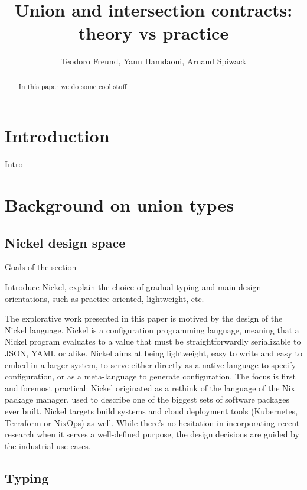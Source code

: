 \documentclass{article}
\title{Union and intersection contracts: theory vs practice}
\author{Teodoro Freund, Yann Hamdaoui, Arnaud Spiwack}
\begin{document}
\maketitle

\begin{abstract}
 In this paper we do some cool stuff.
\end{abstract}

\section*{Introduction}
Intro

\section{Background on union types}

\subsection{Nickel design space}

\color{red}Goals of the section

Introduce Nickel, explain the choice of gradual
typing and main design orientations, such as practice-oriented, lightweight,
etc.\vspace{0.5cm}\color{black}

The explorative work presented in this paper is motived by the design of the
Nickel language\cite{NickelRepo}. Nickel is a configuration programming
language, meaning that a Nickel program evaluates to a value that must be
straightforwardly serializable to JSON, YAML or alike.  Nickel aims at being
lightweight, easy to write and easy to embed in a larger system, to serve either
directly as a native language to specify configuration, or as a meta-language to
generate configuration. The focus is first and foremost practical: Nickel
originated as a rethink of the language of the Nix package manager, used to
describe one of the biggest sets of software packages ever built\cite{repology}.
Nickel targets build systems and cloud deployment tools (Kubernetes, Terraform
or NixOps) as well. While there's no hesitation in incorporating recent research
when it serves a well-defined purpose, the design decisions are guided by the
industrial use cases.

\subsection{Typing}
\end{document}
